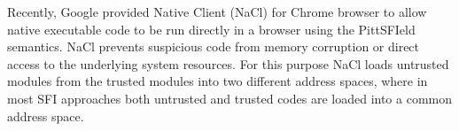 Recently, Google provided Native Client (NaCl) \cite{NaCl-09} for
Chrome browser to allow native executable code to be run directly in a
browser using the PittSFIeld semantics. NaCl prevents suspicious code
from memory corruption or direct access to the underlying system
resources. For this purpose NaCl loads untrusted modules from the
trusted modules into two different address spaces, where in most SFI
approaches both untrusted and trusted codes are loaded into a common
address space.

%




